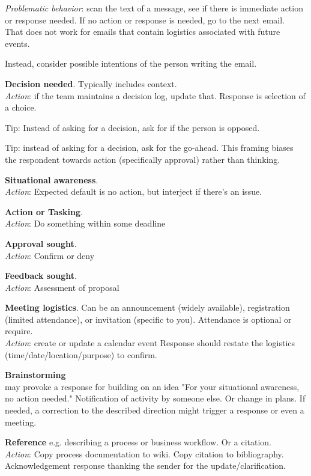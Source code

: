 \textit{Problematic behavior}: scan the text of a message, see if there is immediate action or response needed. If no action or response is needed, go to the next email. \\
 That does not work for emails that contain logistics associated with future events. 

Instead, consider possible intentions of the person writing the email. 

\textbf{Decision needed}. Typically includes context. \\
\textit{Action}: if the team maintains a decision log, update that.
Response is selection of a choice.

Tip: Instead of asking for a decision, ask for if the person is opposed.

Tip: instead of asking for a decision, ask for the go-ahead. This framing biases the respondent towards action (specifically approval) rather than thinking. 

\textbf{Situational awareness}.\\
\textit{Action}: Expected default is no action, but interject if there's an issue.


\textbf{Action or Tasking}.\\
\textit{Action}: Do something within some deadline

\textbf{Approval sought}.\\
\textit{Action}: Confirm or deny

\textbf{Feedback sought}.\\
\textit{Action}: Assessment of proposal


\textbf{Meeting logistics}. Can be an announcement (widely available), registration (limited attendance), or invitation (specific to you). Attendance is optional or require. \\
\textit{Action}: create or update a calendar event
Response should restate the logistics (time/date/location/purpose) to confirm. 

\textbf{Brainstorming}\\
may provoke a response for building on an idea
"For your situational awareness, no action needed." Notification of activity by someone else. Or change in plans. 
If needed, a correction to the described direction might trigger a response or even a meeting.

\textbf{Reference} e.g. describing a process or business workflow. Or a citation.\\
\textit{Action}: Copy process documentation to wiki. Copy citation to bibliography.
Acknowledgement response thanking the sender for the update/clarification.

